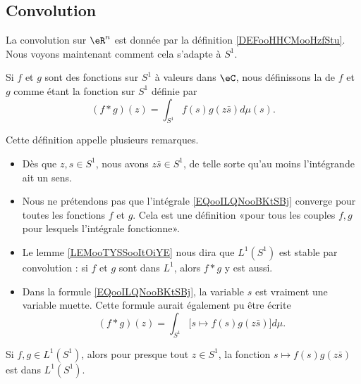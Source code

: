 \subsection{Convolution}

La convolution sur \( \eR^n\) est donnée par la définition \ref{DEFooHHCMooHzfStu}. Nous voyons maintenant comment cela s'adapte à \( S^1\).
\begin{definition}      \label{DEFooSKWOooEdIHoH}
	Si \( f\) et \( g\) sont des fonctions sur \( S^1\) à valeurs dans \( \eC\), nous définissons la  de \( f\) et \( g\) comme étant la fonction sur \( S^1\) définie par
	\begin{equation}        \label{EQooILQNooBKtSBj}
		(f*g)(z)=\int_{S^1}f(s)g(z\bar s)d\mu(s).
	\end{equation}
\end{definition}

Cette définition appelle plusieurs remarques.
\begin{itemize}
	\item
	      Dès que \( z,s\in S^1\), nous avons \( z\bar s\in S^1\), de telle sorte qu'au moins l'intégrande ait un sens.
	\item Nous ne prétendons pas que l'intégrale \eqref{EQooILQNooBKtSBj} converge pour toutes les fonctions \( f\) et \( g\). Cela est une définition «pour tous les couples \( f,g\) pour lesquels l'intégrale fonctionne».
	\item
	      Le lemme \ref{LEMooTYSSooItOiYE} nous dira que \( L^1(S^1)\) est stable par convolution : si \( f\) et \( g\) sont dans \( L^1\), alors \( f*g\) y est aussi.
	\item
	      Dans la formule \eqref{EQooILQNooBKtSBj}, la variable \( s\) est vraiment une variable muette. Cette formule aurait également pu être écrite
	      \begin{equation}
		      (f*g)(z)=\int_{S^1} \big[ s\mapsto f(s)g(z\bar s) \big]d\mu.
	      \end{equation}
\end{itemize}

\begin{lemma}        \label{LEMooTYSSooItOiYE}
	Si \( f,g\in L^1(S^1)\), alors pour presque tout \( z\in S^1\), la fonction \( s\mapsto f(s)g(z\bar s)\) est dans \( L^1(S^1)\).
\end{lemma}

